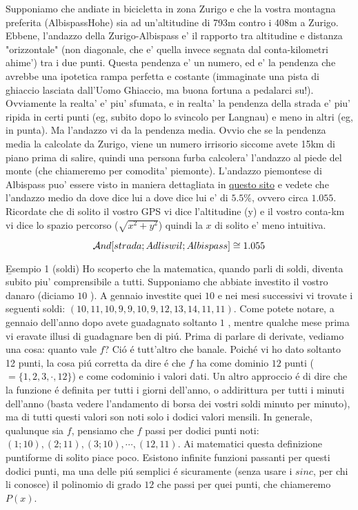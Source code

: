 Supponiamo che andiate in bicicletta in zona Zurigo e che la vostra montagna preferita (AlbispassHohe) sia ad un'altitudine di 793m 
contro i 408m a Zurigo. Ebbene, l'andazzo della Zurigo-Albispass e' il rapporto tra altitudine e distanza "orizzontale" (non diagonale, che e' quella invece
segnata dal conta-kilometri ahime') tra i due punti. Questa pendenza e' un numero, ed e' la pendenza che avrebbe una ipotetica rampa perfetta e costante
(immaginate una pista di ghiaccio lasciata dall'Uomo Ghiaccio, ma buona fortuna a pedalarci su!). Ovviamente la realta' e' piu' sfumata, e in realta' la
pendenza della strada e' piu' ripida in certi punti (eg, subito dopo lo svincolo per Langnau) e meno in altri (eg, in punta). Ma l'andazzo vi da la pendenza
media. Ovvio che se la pendenza media la calcolate da Zurigo, viene un numero irrisorio siccome avete 15km di piano prima di salire, quindi una persona furba 
calcolera' l'andazzo al piede del monte (che chiameremo per comodita' piemonte). L'andazzo piemontese di Albispass puo' essere visto in 
maniera dettagliata in  \href{https://www.climbbybike.com/climb/Albispass/5186}{questo sito} e vedete che l'andazzo medio da dove dice lui a dove dice 
lui e' di $ 5.5 \% $, ovvero circa $ 1.055 $. Ricordate che di solito il vostro GPS vi dice l'altitudine (y) e il vostro conta-km vi dice lo spazio percorso ($\sqrt{x^2+y^2}$) 
quindi la $x$ di solito e' meno intuitiva.

\begin{equation}
 \mathcal{A}nd[strada; Adliswil; Albispass] \cong 1.055 
\end{equation}

\b{Esempio 1 (soldi)} Ho scoperto che la matematica, quando parli di soldi, diventa subito piu' comprensibile a tutti. 
Supponiamo che abbiate investito il vostro danaro (diciamo $10$ \EUR).
A gennaio investite quei $10$ e nei mesi successivi vi trovate i seguenti soldi: $(10,11,10,9,9,10,9,12,13,14,11,11)$. Come potete notare,
a gennaio dell'anno dopo avete guadagnato soltanto $1$ \EUR, mentre qualche mese prima vi eravate illusi di guadagnare ben di pi\'u. Prima di
parlare di derivate, vediamo una cosa: quanto vale $f$? Ci\'o \'e tutt'altro che banale. Poich\'e vi ho dato soltanto 12 punti, la cosa pi\'u
corretta da dire \'e che $f$ ha come dominio $12$ punti ($= \{1,2,3,\cdot,12\}$) e come codominio i valori dati. Un altro approccio \'e di dire
che la funzione \'e definita per tutti i giorni dell'anno, o addirittura per tutti i minuti dell'anno (basta vedere l'andamento di borsa dei
vostri soldi minuto per minuto), ma di tutti questi valori son noti solo i dodici valori mensili. In generale, qualunque sia $f$, pensiamo
che $f$ passi per dodici punti noti: $(1;10),(2;11),(3;10),\cdots,(12,11)$. Ai matematici questa definizione puntiforme di solito piace poco.
Esistono infinite funzioni passanti per questi dodici punti, ma una delle pi\'u semplici \'e sicuramente (senza usare i $sinc$, per chi li
conosce) il polinomio di grado $12$ che passi per quei punti, che chiameremo $P(x)$.

